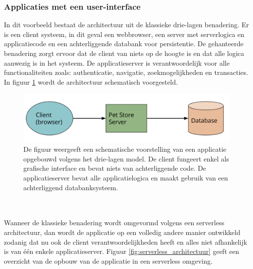\subsubsection{Applicaties met een user-interface}
In dit voorbeeld bestaat de architectuur uit de klassieke drie-lagen benadering. Er is een client systeem, in dit geval een webbrowser, een server met serverlogica en applicatiecode en een achterliggende databank voor persistentie. De gehanteerde benadering zorgt ervoor dat de client van niets op de hoogte is en dat alle logica aanwezig is in het systeem. De applicatieserver is verantwoordelijk voor alle functionaliteiten zoals: authenticatie, navigatie, zoekmogelijkheden en transacties. In figuur \ref{fig:drielagen_architectuur} wordt de architectuur schematisch voorgesteld.
\begin{figure}
    \includegraphics[width=1\textwidth]{img/drielagen_architectuur.png}
    \caption{De figuur weergeeft een schematische voorstelling van een  applicatie opgebouwd volgens het drie-lagen model. De client fungeert enkel als grafische interface en bevat niets van achterliggende code. De applicatieserver bevat alle applicatielogica en maakt gebruik van een achterliggend databanksysteem. \autocite{Roberts2018}} 
    \label{fig:drielagen_architectuur}  
\end{figure}
\\\\
Wanneer de klassieke benadering wordt omgevormd volgens een serverless architectuur, dan wordt de applicatie op een volledig andere manier ontwikkeld zodanig dat nu ook de client verantwoordelijkheden heeft en alles niet afhankelijk is van één enkele applicatieserver. Figuur \ref{fig:serverless_architectuur} geeft een overzicht van de opbouw van de applicatie in een serverless omgeving.
